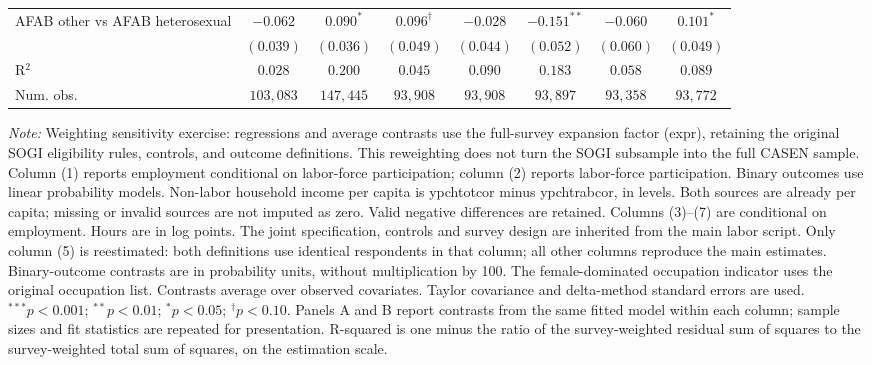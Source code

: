 \begin{table}[htpb!]
{\begin{tabular}{l c c c c c c c}
AFAB other vs AFAB heterosexual & $-0.062$ & $0.090^{*}$ & $0.096^{\dagger}$ & $-0.028$ & $-0.151^{**}$ & $-0.060$ & $0.101^{*}$ \\
 & $(0.039)$ & $(0.036)$ & $(0.049)$ & $(0.044)$ & $(0.052)$ & $(0.060)$ & $(0.049)$ \\
\hline
R$^2$ & $0.028$ & $0.200$ & $0.045$ & $0.090$ & $0.183$ & $0.058$ & $0.089$ \\
Num. obs. & $103,083$ & $147,445$ & $93,908$ & $93,908$ & $93,897$ & $93,358$ & $93,772$ \\
\hline
\end{tabular}%
}
\par\vspace{1ex}
\begin{minipage}{\textwidth}\footnotesize\raggedright
\textit{Note:} Weighting sensitivity exercise: regressions and average contrasts use the full-survey expansion factor (expr), retaining the original SOGI eligibility rules, controls, and outcome definitions. This reweighting does not turn the SOGI subsample into the full CASEN sample. Column (1) reports employment conditional on labor-force participation; column (2) reports labor-force participation. Binary outcomes use linear probability models. Non-labor household income per capita is ypchtotcor minus ypchtrabcor, in levels. Both sources are already per capita; missing or invalid sources are not imputed as zero. Valid negative differences are retained.  Columns (3)--(7) are conditional on employment. Hours are in log points. The joint specification, controls and survey design are inherited from the main labor script. Only column (5) is reestimated: both definitions use identical respondents in that column; all other columns reproduce the main estimates. Binary-outcome contrasts are in probability units, without multiplication by 100. The female-dominated occupation indicator uses the original occupation list. Contrasts average over observed covariates. Taylor covariance and delta-method standard errors are used. $^{***}p<0.001$; $^{**}p<0.01$; $^{*}p<0.05$; $^{\dagger}p<0.10$. Panels A and B report contrasts from the same fitted model within each column; sample sizes and fit statistics are repeated for presentation. R-squared is one minus the ratio of the survey-weighted residual sum of squares to the survey-weighted total sum of squares, on the estimation scale.
\end{minipage}
\end{table}
